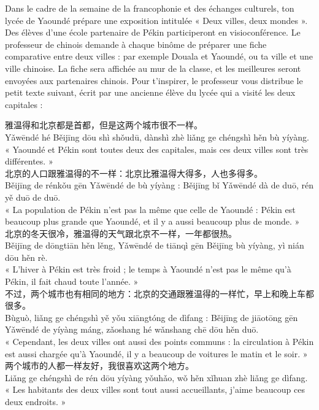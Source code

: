 \documentclass[11pt]{article}
\newcounter{popsec}
\newcounter{popsub}
\newcommand{\courssub}[1]{%
  \stepcounter{popsub}%
  \par\vspace{9pt}\noindent{\popxbold\fontsize{11.5}{13}\selectfont\color{popink}{\color{poporange}\thepopsec.\thepopsub}\hspace{6pt}#1}\par\nopagebreak\vspace{4pt}
}
\begin{document}
\courssub{Situation}

Dans le cadre de la semaine de la francophonie et des échanges culturels, ton lycée de Yaoundé prépare une exposition intitulée « Deux villes, deux mondes ». Des élèves d'une école partenaire de Pékin participeront en visioconférence. Le professeur de chinois demande à chaque binôme de préparer une fiche comparative entre deux villes : par exemple Douala et Yaoundé, ou ta ville et une ville chinoise. La fiche sera affichée au mur de la classe, et les meilleures seront envoyées aux partenaires chinois. Pour t'inspirer, le professeur vous distribue le petit texte suivant, écrit par une ancienne élève du lycée qui a visité les deux capitales :

\begin{textebox}
雅温得和北京都是首都，但是这两个城市很不一样。\\
Yǎwēndé hé Běijīng dōu shì shǒudū, dànshì zhè liǎng ge chéngshì hěn bù yíyàng.\\
« Yaoundé et Pékin sont toutes deux des capitales, mais ces deux villes sont très différentes. »\\[4pt]
北京的人口跟雅温得的不一样：北京比雅温得大得多，人也多得多。\\
Běijīng de rénkǒu gēn Yǎwēndé de bù yíyàng : Běijīng bǐ Yǎwēndé dà de duō, rén yě duō de duō.\\
« La population de Pékin n'est pas la même que celle de Yaoundé : Pékin est beaucoup plus grande que Yaoundé, et il y a aussi beaucoup plus de monde. »\\[4pt]
北京的冬天很冷，雅温得的天气跟北京不一样，一年都很热。\\
Běijīng de dōngtiān hěn lěng, Yǎwēndé de tiānqì gēn Běijīng bù yíyàng, yì nián dōu hěn rè.\\
« L'hiver à Pékin est très froid ; le temps à Yaoundé n'est pas le même qu'à Pékin, il fait chaud toute l'année. »\\[4pt]
不过，两个城市也有相同的地方：北京的交通跟雅温得的一样忙，早上和晚上车都很多。\\
Bùguò, liǎng ge chéngshì yě yǒu xiāngtóng de dìfang : Běijīng de jiāotōng gēn Yǎwēndé de yíyàng máng, zǎoshang hé wǎnshang chē dōu hěn duō.\\
« Cependant, les deux villes ont aussi des points communs : la circulation à Pékin est aussi chargée qu'à Yaoundé, il y a beaucoup de voitures le matin et le soir. »\\[4pt]
两个城市的人都一样友好，我很喜欢这两个地方。\\
Liǎng ge chéngshì de rén dōu yíyàng yǒuhǎo, wǒ hěn xǐhuan zhè liǎng ge dìfang.\\
« Les habitants des deux villes sont tout aussi accueillants, j'aime beaucoup ces deux endroits. »
\end{textebox}
\end{document}
